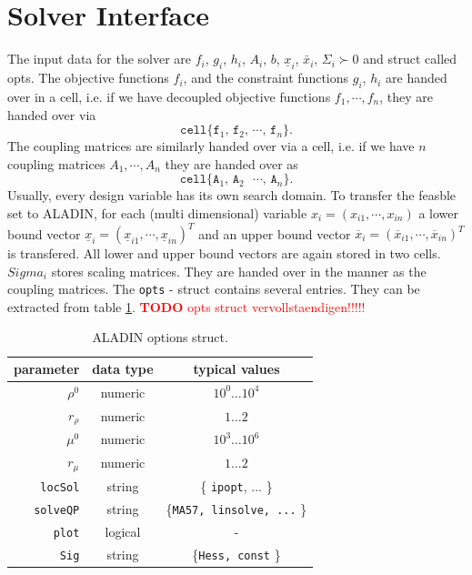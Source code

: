 \documentclass[]{scrartcl}
\begin{document}
\section{Solver Interface}
The input data for the solver are $f_i$, $g_i$, $h_i$, $A_i$, $b$, $\underline{x}_i$, $\bar x_i$, $\Sigma_i \succ 0$ and struct called opts. The objective functions $f_i$, and the constraint functions $g_i$, $h_i$ are handed over in a cell, i.e. if we have decoupled objective functions $f_1, \cdots , f_n$, they are handed over via $$
\texttt{cell\{f$_1$, f$_2$, $\cdots$, f$_n$\}}.$$
 The coupling matrices are similarly handed over via a cell, i.e. if we have $n$ coupling matrices $A_1, \cdots , A_n$ they are handed over as 
 $$\texttt{cell\{A$_1$, A$_2$ $\cdots$, A$_n$\}}.$$ Usually, every design variable has its own search domain. To transfer the feasble set to ALADIN, for each (multi dimensional) variable $x_i = (x_{i1}, \cdots , x_{in})$ a lower bound vector $\underline{x}_i = (\underline{x}_{i1}, \cdots , \underline{x}_{in})^T$ and an upper bound vector $\overline{x}_i = (\overline{x}_{i1}, \cdots , \overline{x}_{in})^T$ is transfered. All lower and upper bound vectors are again stored in two cells. $Sigma_i$ stores scaling matrices. They are handed over in the manner as the coupling matrices. The \texttt{opts} - struct contains several entries. They can be extracted from table \ref{tab: ALADIN options struct.}. \textcolor{red}{\textbf{TODO} opts struct vervollstaendigen!!!!!} 
\begin{table}
	\centering
	\begin{tabular}{rcc}
		\hline
parameter & data type & typical values \\ 
\hline
$\rho^0$	& numeric  & $10^0 \dots 10^4$ \\ 
	\hline 
$r_\rho$	& numeric  & $1 \dots 2$ \\ 
	\hline 
$\mu^0$	& numeric  & $10^3 \dots 10^6$ \\ 
	\hline 
$r_\mu$	& numeric  & $1 \dots 2$  \\ 
	\hline 
\texttt{locSol}	& string  &\{ \texttt{ipopt}, ... \} \\ 
	\hline 
\texttt{solveQP}	& string  & \{\texttt{MA57, linsolve, ...} \}  \\ 
	\hline 
\texttt{plot}	& logical  & -  \\ 
	\hline 
\texttt{Sig}	& string  & \{\texttt{Hess, const} \} \\ 
	\hline 
\end{tabular} 
\caption{ALADIN options struct.}
\label{tab: ALADIN options struct.}
\end{table}
\end{document}
